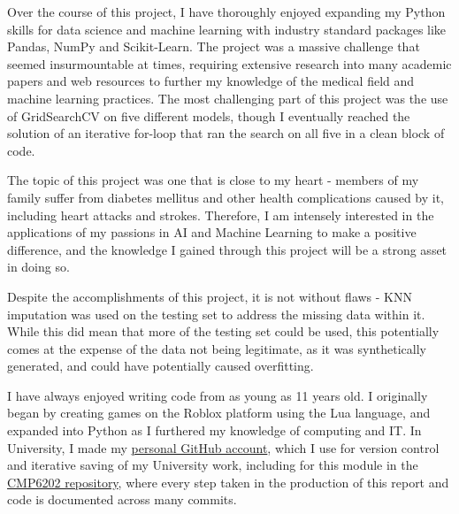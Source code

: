 \documentclass[12pt]{report}
\newcommand{\para}{\vspace{8pt}\noindent}
\begin{document}
Over the course of this project, I have thoroughly enjoyed expanding
my Python skills for data science and machine learning with industry standard packages like Pandas, NumPy and Scikit-Learn. 
The project was a massive challenge that seemed insurmountable at times, requiring extensive research into many academic papers and web resources to further my
knowledge of the medical field and machine learning practices. The most challenging part of this project was the use of GridSearchCV on five different
models, though I eventually reached the solution of an iterative for-loop that ran the search on all five in a clean block of code.

\para The topic of this project was one 
that is close to my heart - members of my family suffer from diabetes mellitus and other health complications caused by it,
including heart attacks and strokes. Therefore, I am intensely interested in the applications of my passions in AI and Machine Learning
to make a positive difference, and the knowledge I gained through this project will be a strong asset in doing so.

\para Despite the accomplishments of this project, it is not without flaws - KNN imputation was used on the testing set to address 
the missing data within it. While this did mean that more of the testing set could be used, this potentially comes at the expense of 
the data not being legitimate, as it was synthetically generated, and could have potentially caused overfitting.

\para I have always enjoyed writing code from as young as 11 years old. I originally began by creating games on the Roblox platform 
using the Lua language, and expanded into Python as I furthered my knowledge of computing 
and IT. In University, I made my \href{https://github.com/LewGoesB00M}{personal GitHub account}, which I use for version control and iterative 
saving of my University work, including for this module in the \href{https://github.com/LewGoesB00M/CMP6202}{CMP6202 repository}, 
where every step taken in the production of this report and code is documented across many commits.







\printbibliography
\end{document}
